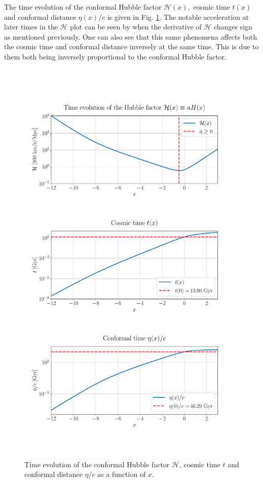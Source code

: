 \documentclass[%
reprint,
 amsmath,amssymb,
 aps,
]{revtex4-2}
\newcommand{\Hp}{\mathcal{H}}
\begin{document}
The time evolution of the conformal Hubble factor $\Hp(x),$ cosmic time $t(x)$ and conformal distance $\eta(x)/c$ is given in Fig. \ref{fig:TimeEvHp}. The notable acceleration at later times in the $\Hp$ plot can be seen by when the derivative of $\Hp$ changes sign as mentioned previously. One can also see that this same phenomena affects both the cosmic time and conformal distance inversely at the same time. This is due to them both being inversely proportional to the conformal Hubble factor.
\begin{figure}[ht!]
	\includegraphics[width = \linewidth]{Figures/merge_Hp_t_eta_Ev.pdf}
	\caption{Time evolution of the conformal Hubble factor $\Hp$, cosmic time $t$ and conformal distance $\eta/c$ as a function of $x$.}
	\label{fig:TimeEvHp}
\end{figure}
\end{document}
